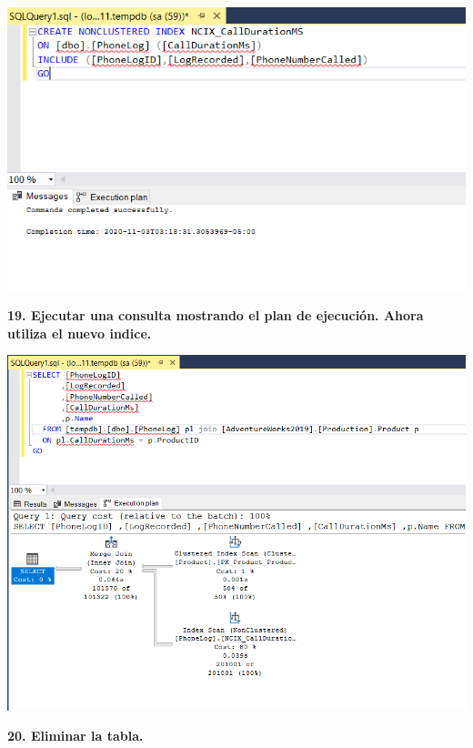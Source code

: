\documentclass{article}
\begin{document}
    \begin{center}
		\includegraphics[width=15cm]{./images/22} 
	\end{center}
	\newpage
\textbf{19. Ejecutar una consulta mostrando el plan de ejecución. Ahora utiliza el nuevo indice.}

    \begin{center}
		\includegraphics[width=15cm]{./images/23} 
	\end{center}
\newpage
\textbf{20. Eliminar la tabla.}
\end{document}
